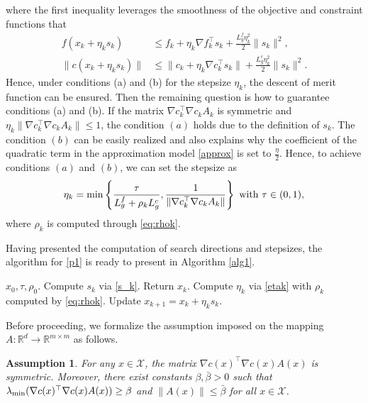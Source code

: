 \documentclass[11pt]{article}
\newtheorem{assumption}{Assumption}
\newcommand{\R}{\mathbb{R}}
\begin{document}
where the first inequality leverages the smoothness of the objective and constraint functions that 
\begin{align*}
    f(x_k+\eta_k s_k) &\leq f_k + \eta_k \nabla f_k^\top s_k + \frac{L_g^f \eta_k^2}{2} \|s_k\|^2,\\
    \|c(x_k+\eta_k s_k)\| &\leq \|c_k + \eta_k \nabla c_k^\top s_k \| + \frac{L_g^c \eta_k^2}{2} \|s_k\|^2.
\end{align*}
Hence, under conditions (a) and (b) for the stepsize $\eta_k$, the descent of merit function can be ensured. Then 
the remaining question is how to guarantee conditions (a) and (b). 
If the matrix \(\nabla c_k^\top \nabla c_kA_k\) is symmetric and \(\eta_k \|\nabla c_k^\top \nabla c_kA_k\| \leq 1\),  the condition \((a)\) holds due to the definition of $s_k$. The condition \((b)\) can be easily realized and also explains why the coefficient of the quadratic term in the  approximation model \eqref{approx} is set to $\frac{\eta}{2}$. Hence, to achieve conditions \((a)\) and \((b)\), we can set the stepsize as
\begin{align}\label{etak}
    \eta_k = \min \left\{\frac{\tau}{L_g^f + \rho_k L_g^c}, \frac{1}{\| \nabla c_k^\top \nabla c_k A_k\|}\right\}~{\rm with}~\tau \in (0,1),
\end{align}
where $\rho_k$ is computed through \eqref{eq:rhok}. 


Having presented the computation of search directions and stepsizes, the algorithm for \eqref{p1} is ready to present in Algorithm \ref{alg1}. 

\begin{algorithm}[H]
  \caption{Adaptive directional decomposition method for equality constrained optimization \eqref{p1}} 
  \label{alg1}
  \begin{algorithmic}[1] 
    \REQUIRE \(x_0, \tau, \rho_0\).
    \STATE Compute \(s_k\) via \eqref{s_k}. 
        \STATE Return \(x_k\).
    \ELSE
        \STATE Compute \(\eta_k\) via \eqref{etak} with \(\rho_k\)  computed by \eqref{eq:rhok}.
        \STATE Update \(x_{k+1} = x_k + \eta_k s_k\).
    \ENDIF
    \ENDFOR 
  \end{algorithmic} 
\end{algorithm}


Before proceeding, we formalize the assumption imposed on the mapping \(A:\R^d\to \R^{m\times m}\) as follows.
\begin{assumption}\label{ass:map-A}
For any $x\in\mathcal X$, the matrix $\nabla c(x)^\top \nabla c(x) A(x)$ is symmetric. Moreover, there exist constants \(\beta, \bar\beta  > 0\) such that  $\lambda_{\rm min}(\nabla c(x)^\top \nabla c(x) A(x)) \geq \beta$ and $\|A(x)\| \leq \bar\beta $ for all \(x \in \mathcal X\).
\end{assumption}
\end{document}
